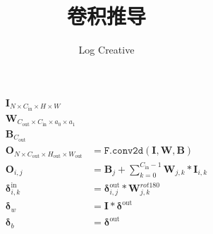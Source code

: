 \documentclass{ctexart}
\begin{document}
    \title{卷积推导}
    \author{Log Creative}
    \date{}
    \maketitle
    \begin{align*}
        \mathbf{I}_{N\times C_\text{in}\times H\times W}&\\
        \mathbf{W}_{C_\text{out}\times C_\text{in}\times a_0\times a_1}&\\
        \mathbf{B}_{C_\text{out}}&\\
        \mathbf{O}_{N\times C_\text{out}\times H_\text{out}\times W_\text{out}}&=\texttt{F.conv2d}(\mathbf{I},\mathbf{W},\mathbf{B})\\
        \mathbf{O}_{i,j}&=\mathbf{B}_j+\sum_{k=0}^{C_\text{in}-1}\mathbf{W}_{j,k}*\mathbf{I}_{i,k}\\
        \mathbf{\delta}^\text{in}_{i,k}&=\mathbf{\delta}^\text{out}_{i,j}*\mathbf{W}^{rot180}_{j,k}\\
        \mathbf{\delta}_{w}&=\mathbf{I}*\mathbf{\delta}^\text{out}\\
        \mathbf{\delta}_{b}&=\mathbf{\delta}^\text{out}
    \end{align*}
\end{document}
